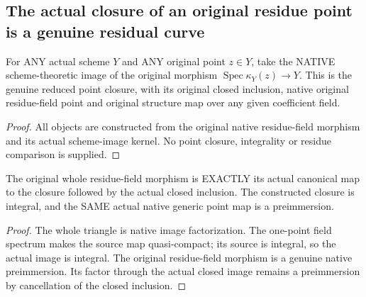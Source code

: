 \subsection{The actual closure of an original residue point is a genuine residual curve}

\begin{definition}
\label{scheme:actual-residue-point-closure}
\leanok
For ANY actual scheme $Y$ and ANY original point $z\in Y$, take the NATIVE
scheme-theoretic image of the original morphism
$\operatorname{Spec}\kappa_Y(z)\to Y$. This is the genuine reduced point
closure, with its original closed inclusion, native original residue-field
point and original structure map over any given coefficient field.
\end{definition}
\begin{proof}
All objects are constructed from the original native residue-field morphism
and its actual scheme-image kernel. No point closure, integrality or residue
comparison is supplied.
\end{proof}

\begin{theorem}
\label{scheme:actual-point-closure-integral-triangle}
\leanok
{}
The original whole residue-field morphism is EXACTLY its actual canonical
map to the closure followed by the actual closed inclusion. The constructed
closure is integral, and the SAME actual native generic point map is a
preimmersion.
\end{theorem}
\begin{proof}
The whole triangle is native image factorization. The one-point field
spectrum makes the source map quasi-compact; its source is integral, so the
actual image is integral. The original residue-field morphism is a genuine
native preimmersion. Its factor through the actual closed image remains a
preimmersion by cancellation of the closed inclusion.
\end{proof}

